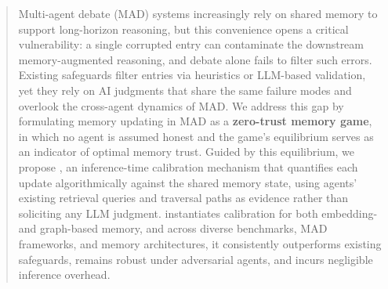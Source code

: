\begin{abstract}


Multi-agent debate (MAD) systems increasingly rely on shared memory to support long-horizon reasoning, but this convenience opens a critical vulnerability: a single corrupted entry can contaminate the downstream memory-augmented reasoning, and debate alone fails to filter such errors. Existing safeguards filter entries via heuristics or LLM-based validation, yet they rely on AI judgments that share the same failure modes and overlook the cross-agent dynamics of MAD. We address this gap by formulating memory updating in MAD as a \textbf{zero-trust memory game}, in which no agent is assumed honest and the game's equilibrium serves as an indicator of optimal memory trust. Guided by this equilibrium, we propose \system, an inference-time calibration mechanism that quantifies each update algorithmically against the shared memory state, using agents' existing retrieval queries and traversal paths as evidence rather than soliciting any LLM judgment. \system instantiates calibration for both embedding- and graph-based memory, and across diverse benchmarks, MAD frameworks, and memory architectures, it consistently outperforms existing safeguards, remains robust under adversarial agents, and incurs negligible inference overhead.
\end{abstract}